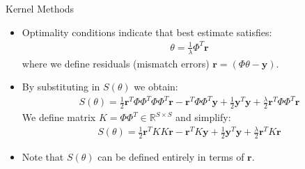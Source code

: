 \documentclass[9pt]{beamer}
\begin{document}

\begin{frame}{Kernel Methods}
\begin{itemize}
  \setlength{\itemsep}{10pt}
\item Optimality conditions indicate that best estimate satisfies:
\begin{align*}
\theta=\frac{1}{\lambda}\Phi^T\mathbf{r}
\end{align*}
where we define residuals (mismatch errors) $\mathbf{r}=(\Phi\theta-\mathbf{y})$.  

\item By substituting in $S(\theta)$ we obtain:
\begin{align*}
S(\theta)= \frac{1}{2}\mathbf{r}^T\Phi\Phi^T\Phi\Phi^T\mathbf{r}-\mathbf{r}^T\Phi\Phi^T\mathbf{y}+\frac{1}{2}\mathbf{y}^T\mathbf{y}+\frac{\lambda}{2}\mathbf{r}^T\Phi\Phi^T\mathbf{r}
\end{align*}
We define matrix $K=\Phi\Phi^T\in \mathbb{R}^{S\times S}$ and simplify:
\begin{align*}
S(\theta)= \frac{1}{2}\mathbf{r}^TKK\mathbf{r}-\mathbf{r}^TK\mathbf{y}+\frac{1}{2}\mathbf{y}^T\mathbf{y}+\frac{\lambda}{2}\mathbf{r}^TK\mathbf{r}
\end{align*}
\item Note that $S(\theta)$ can be defined entirely in terms of $\mathbf{r}$. 

\end{itemize}

\end{frame}

\end{document}
